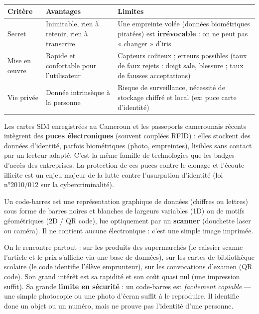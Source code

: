 \documentclass[11pt]{article}
\newcommand{\cle}[1]{{\popxbold\color{popdark}#1}}
\newcounter{popsec}
\newcounter{popsub}
\newcommand{\courssub}[1]{%
  \stepcounter{popsub}%
  \par\vspace{9pt}\noindent{\popxbold\fontsize{11.5}{13}\selectfont\color{popink}{\color{poporange}\thepopsec.\thepopsub}\hspace{6pt}#1}\par\nopagebreak\vspace{4pt}
}
\begin{document}
\begin{center}
\begin{tabularx}{\linewidth}{|l|X|X|}
\hline
\rowcolor{popblueL} \textbf{Critère} & \textbf{Avantages} & \textbf{Limites} \\
\hline
Secret & Inimitable, rien à retenir, rien à transcrire & Une empreinte volée (données biométriques piratées) est \textbf{irrévocable} : on ne peut pas « changer » d'iris \\
\hline
\rowcolor{popcream} Mise en œuvre & Rapide et confortable pour l'utilisateur & Capteurs coûteux ; erreurs possibles (taux de faux rejets : doigt sale, blessure ; taux de fausses acceptations) \\
\hline
Vie privée & Donnée intrinsèque à la personne & Risque de surveillance, nécessité de stockage chiffré et local (ex: puce carte d'identité) \\
\hline
\end{tabularx}
\end{center}

\begin{savaistu}
Les cartes SIM enregistrées au Cameroun et les passeports camerounais récents intègrent des \textbf{puces électroniques} (souvent couplées RFID) : elles stockent des données d'identité, parfois biométriques (photo, empreintes), lisibles sans contact par un lecteur adapté. C'est la même famille de technologies que les badges d'accès des entreprises. La protection de ces puces contre le clonage et l'écoute illicite est un enjeu majeur de la lutte contre l'usurpation d'identité (loi n°2010/012 sur la cybercriminalité).
\end{savaistu}

\courssub{Le code-barres}

\begin{definition}
Un \cle{code-barres} est une représentation graphique de données (chiffres ou lettres) sous forme de barres noires et blanches de largeurs variables (1D) ou de motifs géométriques (2D / QR code), lue optiquement par un \textbf{scanner} (douchette laser ou caméra). Il ne contient aucune électronique : c'est une simple image imprimée.
\end{definition}

On le rencontre partout : sur les produits des supermarchés (le caissier scanne l'article et le prix s'affiche via une base de données), sur les cartes de bibliothèque scolaire (le code identifie l'élève emprunteur), sur les convocations d'examen (QR code). Son grand intérêt est sa rapidité et son coût quasi nul (une impression suffit). Sa grande \textbf{limite en sécurité} : un code-barres est \emph{facilement copiable} — une simple photocopie ou une photo d'écran suffit à le reproduire. Il identifie donc un objet ou un numéro, mais ne prouve pas l'identité d'une personne.
\end{document}

